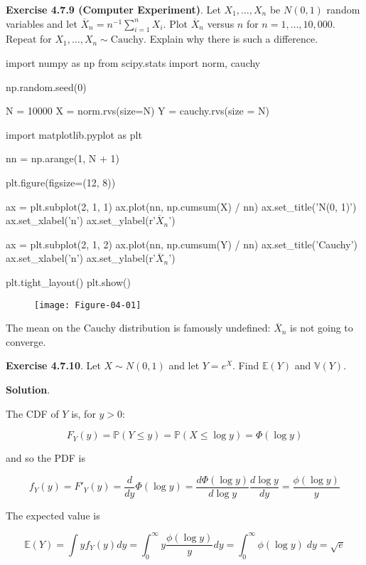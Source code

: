 \textbf{Exercise 4.7.9 (Computer Experiment)}. Let \(X_{1}, \dots, X_{n}\)
be \(N(0, 1)\) random variables and let
\(\overline{X}_{n} = n^{-1} \sum_{i=1}^{n} X_{i}\). Plot \(\overline{X}_{n}\)
versus \(n\) for \(n = 1, \dots, 10,000\). Repeat for
\(X_{1}, \dots, X_{n} \sim \text{Cauchy}\). Explain why there is such a
difference.

\begin{python}
import numpy as np
from scipy.stats import norm, cauchy

np.random.seed(0)

N = 10000
X = norm.rvs(size=N)
Y = cauchy.rvs(size = N)
\end{python}

\begin{python}
import matplotlib.pyplot as plt

nn = np.arange(1, N + 1)

plt.figure(figsize=(12, 8))

ax = plt.subplot(2, 1, 1)
ax.plot(nn, np.cumsum(X) / nn)
ax.set_title('N(0, 1)')
ax.set_xlabel('n')
ax.set_ylabel(r'$\overline{X}_{n}$')

ax = plt.subplot(2, 1, 2)
ax.plot(nn, np.cumsum(Y) / nn)
ax.set_title('Cauchy')
ax.set_xlabel('n')
ax.set_ylabel(r'$\overline{X}_{n}$')

plt.tight_layout()
plt.show()
\end{python}

\begin{figure}[H]
\centering
\texttt{[image: Figure-04-01]}
\end{figure}

The mean on the Cauchy distribution is famously undefined:
\(\overline{X}_ n\) is not going to converge.

\textbf{Exercise 4.7.10}. Let \(X \sim N(0, 1)\) and let \(Y = e^X\).
Find \(\mathbb{E}(Y)\) and \(\mathbb{V}(Y)\).

\textbf{Solution}.

The CDF of \(Y\) is, for \(y > 0\):

\[ F_Y(y) = \mathbb{P}(Y \leq y) = \mathbb{P}(X \leq \log y) = \Phi(\log y) \]

and so the PDF is

\[ f_Y(y) = F'_Y(y) = \frac{d}{dy} \Phi(\log y) = \frac{d \Phi(\log y)}{d \log y} \frac{d \log y}{dy} = \frac{\phi(\log y)}{y}\]

The expected value is

\[ \mathbb{E}(Y) = \int y f_Y(y) dy = \int_{0}^{\infty} y \frac{\phi(\log y)}{y} dy = \int_{0}^{\infty} \phi(\log y)\; dy = \sqrt{e}\]

